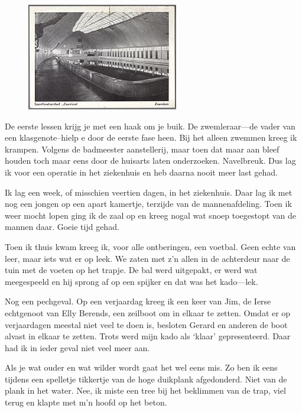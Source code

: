 \documentclass[12pt,twoside, openright]{memoir}
\begin{document}
\begin{figure}
\includegraphics[width=\textwidth]{img/ch11/sportbad}
\end{figure}

De eerste lessen krijg je met een haak om je buik. De zwemleraar---de vader van een klasgenote--hielp e door de eerste fase heen. Bij het alleen zwemmen kreeg ik krampen. Volgens de badmeester aanstellerij, maar toen dat maar aan bleef houden toch maar eens door de huisarts laten onderzoeken. Navelbreuk. Dus lag ik voor een operatie in het ziekenhuis en heb daarna nooit meer last gehad.

Ik lag een week, of misschien veertien dagen, in het ziekenhuis. Daar lag ik met nog een jongen op een apart kamertje, terzijde van de mannenafdeling. Toen ik weer mocht lopen ging ik de zaal op en kreeg nogal wat snoep toegestopt van de mannen daar. Goeie tijd gehad.

Toen ik thuis kwam kreeg ik, voor alle ontberingen, een voetbal. Geen echte van leer, maar iets wat er op leek. We zaten met z’n allen in de achterdeur naar de tuin met de voeten op het trapje. De bal werd uitgepakt, er werd wat meegespeeld en hij sprong af op een spijker en dat was het kado---lek. 

Nog een pechgeval. Op een verjaardag kreeg ik een keer van Jim, de Ierse echtgenoot van Elly Berends, een zeilboot om in elkaar te zetten. Omdat er op verjaardagen meestal niet veel te doen is, besloten Gerard en anderen de boot alvast in elkaar te zetten. Trots werd mijn kado als ‘klaar’ gepresenteerd. Daar had ik in ieder geval niet veel meer aan.

Als je wat ouder en wat wilder wordt gaat het wel eens mis. Zo ben ik eens tijdens een spelletje tikkertje van de hoge duikplank afgedonderd. Niet van de plank in het water. Nee, ik miste een tree bij het beklimmen van de trap, viel terug en klapte met m’n hoofd op het beton. 
\end{document}
